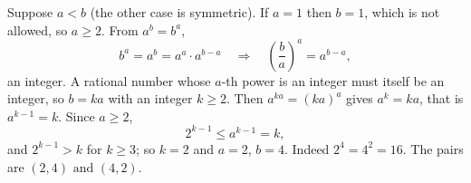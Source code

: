 Suppose $a<b$ (the other case is symmetric). If $a=1$ then $b=1$, which is not allowed, so $a\ge2$. From $a^b=b^a$,
\[b^a=a^b=a^a\cdot a^{b-a}\quad\Longrightarrow\quad\left(\dfrac {b}{a}\right)^a=a^{b-a},\]
an integer. A rational number whose $a$-th power is an integer must itself be an integer, so $b=ka$ with an integer $k\ge2$. Then $a^{ka}=(ka)^a$ gives $a^k=ka$, that is $a^{k-1}=k$. Since $a\ge2$,
\[2^{k-1}\le a^{k-1}=k,\]
and $2^{k-1}>k$ for $k\ge3$; so $k=2$ and $a=2$, $b=4$. Indeed $2^4=4^2=16$. The pairs are $\boxed{(2,4)\text{ and }(4,2)}$.
